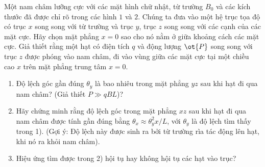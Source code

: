 \begin{vd}%
Một nam châm lưỡng cực với các mặt hình chữ nhật, từ trường $B_0$ và các kích thước đã được chỉ rõ trong các hình $1$ và $2$. Chúng ta đưa vào một hệ trục tọa độ có trục $x$ song song với từ trường và trục $y$, trục $z$ song song với các cạnh của các mặt cực. Hãy chọn mặt phẳng $x=0$ sao cho nó nằm ở giữa khoảng cách các mặt cực. Giả thiết rằng một hạt có điện tích $q$ và động lượng $\ot{P}$ song song với trục $z$ được phóng vào nam châm, đi vào vùng giữa các mặt cực tại một chiều cao $x$ trên mặt phẳng trung tâm $x=0$.
\begin{enumerate}[1)]
    \item Độ lệch góc gần đúng $\theta_y$ là bao nhiêu trong mặt phẳng $yz$ sau khi hạt đi qua nam châm? (Giả thiết $P\gg qBL$)?
    \item Hãy chứng minh rằng độ lệch góc trong mặt phẳng $xz$ sau khi hạt đi qua nam châm được tính gần đúng bằng $\theta_x\approx\theta_y^2 x/L$, với $\theta_y$ là độ lệch tìm thấy trong 1). (Gợi ý: Độ lệch này được sinh ra bởi từ trường rìa tác động lên hạt, khi nó ra khỏi nam châm).
    \item Hiệu ứng tìm được trong 2) hội tụ hay không hội tụ các hạt vào trục?
\begin{center}
    


\begin{tikzpicture}[x=0.75pt,y=0.75pt,yscale=-1,xscale=1]


\end{tikzpicture}
\end{center}
\end{enumerate}
\end{vd}
